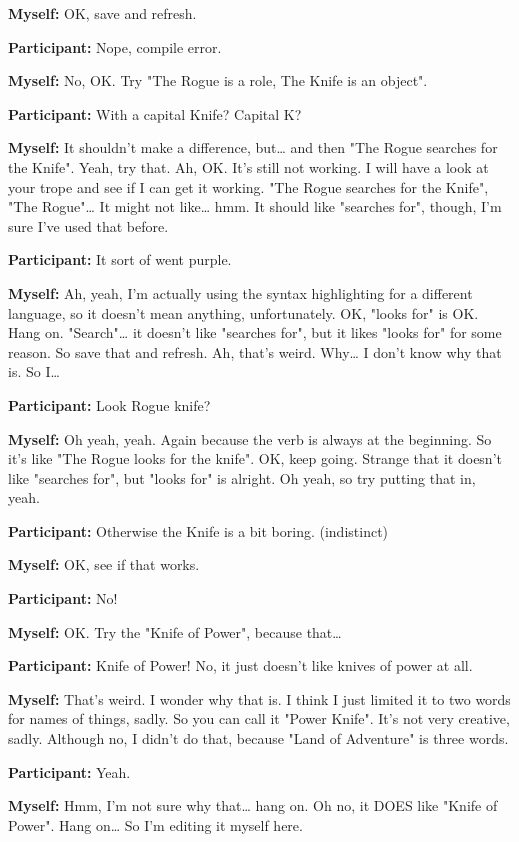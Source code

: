 \documentclass[11pt]{report}
\newcommand{\llabel}[1]{\hypertarget{llineno:#1}{\linelabel{#1}}}
\begin{document}
\begin{linenumbers}
\textbf{Myself:} OK, save and refresh.

\textbf{Participant:} Nope, compile error.

\textbf{Myself:} No, OK. Try "The Rogue is a role, The Knife is an object".

\textbf{Participant:} With a capital Knife? Capital K?\llabel{lne:syntax5c2}

\textbf{Myself:} It shouldn't make a difference, but\ldots{} and then "The Rogue searches for the Knife". Yeah, try that. Ah, OK. It's still not working. I will have a look at your trope and see if I can get it working. "The Rogue searches for the Knife", "The Rogue"\ldots{} It might not like\ldots{} hmm. It should like "searches for", though, I'm sure I've used that before.

\textbf{Participant:} It sort of went purple.

\textbf{Myself:} Ah, yeah, I'm actually using the syntax highlighting for a different language, so it doesn't mean anything, unfortunately. OK, "looks for" is OK. Hang on. "Search"\ldots{} it doesn't like "searches for", but it likes "looks for" for some reason. So save that and refresh. Ah, that's weird. Why\ldots{} I don't know why that is. So I\ldots{}

\textbf{Participant:} Look Rogue knife?

\textbf{Myself:} Oh yeah, yeah. Again because the verb is always at the beginning. So it's like "The Rogue looks for the knife". OK, keep going. Strange that it doesn't like "searches for", but "looks for" is alright. Oh yeah, so try putting that in, yeah.

\textbf{Participant:} Otherwise the Knife is a bit boring. (indistinct)

\textbf{Myself:} OK, see if that works.

\textbf{Participant:} No!

\textbf{Myself:} OK. Try the "Knife of Power", because that\ldots{}

\textbf{Participant:} Knife of Power! No, it just doesn't like knives of power at all.

\textbf{Myself:} That's weird. I wonder why that is. I think I just limited it to two words for names of things, sadly. So you can call it "Power Knife". It's not very creative, sadly. Although no, I didn't do that, because "Land of Adventure" is three words.

\textbf{Participant:} Yeah.

\textbf{Myself:} Hmm, I'm not sure why that\ldots{} hang on. Oh no, it DOES like "Knife of Power". Hang on\ldots{} So I'm editing it myself here.


\end{linenumbers}
\end{document}
